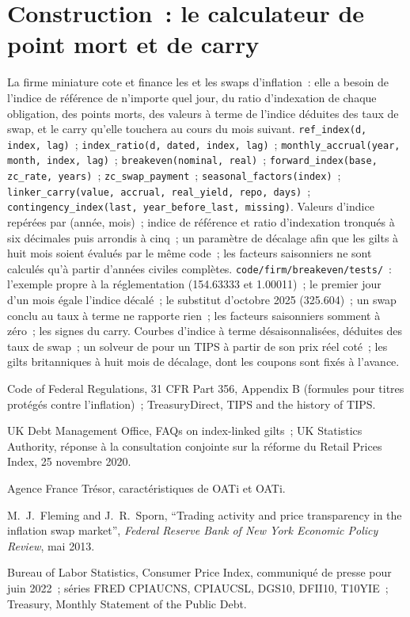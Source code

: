 \section{Construction~: le calculateur de point mort et de carry}\label{bld:m2:inflation-markets:breakeven}

\begin{build}
 La firme miniature cote et finance les 
et les swaps d'inflation~: elle a besoin de l'indice de référence de n'importe quel jour, du ratio d'indexation de chaque obligation,
des points morts, des valeurs à terme de l'indice déduites des taux de swap, et le carry
qu'elle touchera au cours du mois suivant.
 \texttt{ref\_index(d, index, lag)}~;
\texttt{index\_ratio(d, dated, index, lag)}~; \texttt{monthly\_accrual(year,
month, index, lag)}~; \texttt{breakeven(nominal, real)}~;
\texttt{forward\_index(base, zc\_rate, years)}~; \texttt{zc\_swap\_payment}~;
\texttt{seasonal\_factors(index)}~; \texttt{linker\_carry(value, accrual,
real\_yield, repo, days)}~; \texttt{contingency\_index(last,
year\_before\_last, missing)}.  Valeurs d'indice repérées par (année, mois)~; indice de référence et ratio d'indexation
tronqués à six décimales puis arrondis à cinq~; un paramètre de décalage afin que
les gilts à huit mois soient évalués par le même code~; les facteurs saisonniers
ne sont calculés qu'à partir d'années civiles complètes.
 \texttt{code/firm/breakeven/tests/}~: l'exemple
propre à la réglementation (154.63333 et 1.00011)~; le premier jour d'un mois égale
l'indice décalé~; le substitut d'octobre 2025 (325.604)~; un swap conclu au taux à terme ne rapporte rien~; les facteurs saisonniers somment à zéro~;
les signes du carry.
 Courbes d'indice à terme désaisonnalisées, déduites des taux de swap~; un
solveur de  pour un TIPS à partir de son prix réel coté~; les gilts britanniques à huit
mois de décalage, dont les coupons sont fixés à l'avance.
\end{build}

\begin{omsources}
\item Code of Federal Regulations, 31 CFR Part 356, Appendix B (formules pour
titres protégés contre l'inflation)~; TreasuryDirect, TIPS and the history of TIPS.
\item UK Debt Management Office, FAQs on index-linked gilts~; UK Statistics
Authority, réponse à la consultation conjointe sur la réforme du Retail Prices
Index, 25 novembre 2020.
\item Agence France Trésor, caractéristiques de OATi et OAT\texteuro i.
\item M.~J.~Fleming and J.~R.~Sporn, ``Trading activity and price transparency in the inflation swap market'', \emph{Federal Reserve Bank of New
York Economic Policy Review}, mai 2013.
\item Bureau of Labor Statistics, Consumer Price Index, communiqué de presse pour juin
2022~; séries FRED CPIAUCNS, CPIAUCSL, DGS10, DFII10, T10YIE~; Treasury, Monthly Statement of the Public Debt.
\end{omsources}

